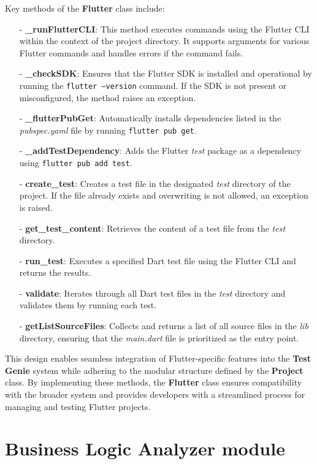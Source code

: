 Key methods of the \textbf{Flutter} class include:
\begin{itemize}
    \item[-] \textbf{\_runFlutterCLI}: This method executes commands using the Flutter CLI within the context of the project directory. It supports arguments for various Flutter commands and handles errors if the command fails.
    \item[-] \textbf{\_checkSDK}: Ensures that the Flutter SDK is installed and operational by running the \texttt{flutter --version} command. If the SDK is not present or misconfigured, the method raises an exception.
    \item[-] \textbf{\_flutterPubGet}: Automatically installs dependencies listed in the \textit{pubspec.yaml} file by running \texttt{flutter pub get}.
    \item[-] \textbf{\_addTestDependency}: Adds the Flutter \textit{test} package as a dependency using \texttt{flutter pub add test}.
    \item[-] \textbf{create\_test}: Creates a test file in the designated \textit{test} directory of the project. If the file already exists and overwriting is not allowed, an exception is raised.
    \item[-] \textbf{get\_test\_content}: Retrieves the content of a test file from the \textit{test} directory.
    \item[-] \textbf{run\_test}: Executes a specified Dart test file using the Flutter CLI and returns the results.
    \item[-] \textbf{validate}: Iterates through all Dart test files in the \textit{test} directory and validates them by running each test.
    \item[-] \textbf{getListSourceFiles}: Collects and returns a list of all source files in the \textit{lib} directory, ensuring that the \textit{main.dart} file is prioritized as the entry point.
\end{itemize}

This design enables seamless integration of Flutter-specific features into the \textbf{Test Genie} system while adhering to the modular structure defined by the \textbf{Project} class. By implementing these methods, the \textbf{Flutter} class ensures compatibility with the broader system and provides developers with a streamlined process for managing and testing Flutter projects.

\section{Business Logic Analyzer module}


